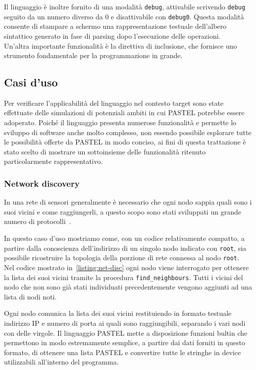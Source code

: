 \documentclass[10pt]{article}
\begin{document}
Il linguaggio è inoltre fornito di una modalità \texttt{debug}, attivabile scrivendo \texttt{debug} seguito da un numero diverso da 0 e disattivabile con \texttt{debug0}. Questa modalità consente di stampare a schermo una rappresentazione testuale dell'albero sintattico generato in fase di parsing dopo l'esecuzione delle operazioni. \\
Un'altra importante funzionalità è la direttiva di inclusione, che fornisce uno strumento fondamentale per la programmazione in grande.


\subsection{Casi d'uso}\label{subsection:casi-d_uso}
Per verificare l'applicabilità del linguaggio nel contesto target sono state effettuate delle simulazioni di potenziali ambiti in cui PASTEL potrebbe essere adoperato. Poiché il linguaggio presenta numerose funzionalità e permette lo sviluppo di software anche molto complesso, non essendo possibile esplorare tutte le possibilità offerte da PASTEL in modo conciso, ai fini di questa trattazione è stato scelto di mostrare un sottoinsieme delle funzionalità ritenuto particolarmente rappresentativo.

\subsubsection{Network discovery}\label{subsubsection:net-disc}
In una rete di sensori generalmente è necessario che ogni nodo sappia quali sono i suoi vicini e come raggiungerli, a questo scopo sono stati sviluppati un grande numero di protocolli~\cite{narten1998neighbor, kandhalu2010u, alsa2012secure}.

In questo caso d'uso mostriamo come, con un codice relativamente compatto, a partire dalla conoscienza dell'indirizzo di un singolo nodo indicato con \texttt{root}, sia possibile ricostruire la topologia della porzione di rete connessa al nodo \texttt{root}.\\
Nel codice mostrato in~\ref{listing:net-disc} ogni nodo viene interrogato per ottenere la lista dei suoi vicini tramite la procedura \texttt{find\_neighbours}. Tutti i vicini del nodo che non sono già stati individuati precedentemente vengono aggiunti ad una lista di nodi noti.

Ogni nodo comunica la lista dei suoi vicini restituiendo in formato testuale indirizzo IP e numero di porta ai quali sono raggiungibili, separando i vari nodi con delle virgole. Il linguaggio PASTEL mette a disposizione funzioni bultin che permettono in modo estremamente semplice, a partire dai dati forniti in questo formato, di ottenere una lista PASTEL e convertire tutte le stringhe in device utilizzabili all'interno del programma.
\end{document}
